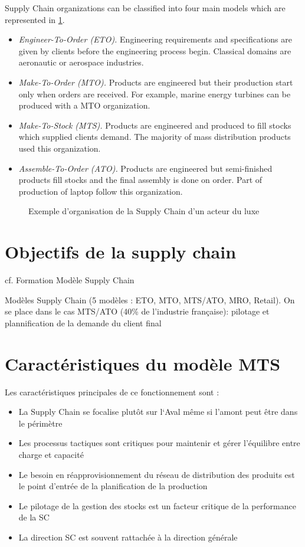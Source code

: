 Supply Chain organizations can be classified into four main models \cite{arnold2007} which are represented in \cref{fig:supply-chain-models}.
\begin{itemize}
  \item \emph{Engineer-To-Order (ETO).} Engineering requirements and specifications are given by clients before the engineering process begin. Classical domains are aeronautic or aerospace industries.
  \item \emph{Make-To-Order (MTO).} Products are engineered but  their production start only when orders are received. For example, marine energy turbines can be produced with a MTO organization.
  \item \emph{Make-To-Stock (MTS).} Products are engineered and produced to fill stocks which supplied clients demand. The majority of mass distribution products used this organization.
  \item \emph{Assemble-To-Order (ATO).} Products are engineered but semi-finished products fill stocks and the final assembly is done on order. Part of production of laptop follow this organization.
\end{itemize}


\begin{figure}[h]
  \centering
  \caption{Exemple d'organisation de la Supply Chain d'un acteur du luxe}
  \label{fig:supply-chain-models}
\end{figure}

\section{Objectifs de la supply chain}

cf. Formation Modèle Supply Chain

Modèles Supply Chain (5 modèles : ETO, MTO, MTS/ATO, MRO, Retail).
On se place dans le cas MTS/ATO (40\% de l'industrie française): pilotage et plannification de la demande du client final

\section{Caractéristiques du modèle MTS}

Les caractéristiques principales de ce fonctionnement sont :
\begin{itemize}
  \item La Supply Chain se focalise plutôt sur l‘Aval même si l’amont peut être dans  le périmètre
  \item Les processus tactiques sont critiques pour maintenir et gérer l’équilibre entre charge et capacité
  \item Le besoin en réapprovisionnement du réseau de distribution des produits est le point d’entrée de la planification de la production
  \item Le pilotage de la gestion des stocks est un facteur critique de la performance de la SC
  \item La direction SC est souvent rattachée à la direction générale
\end{itemize}


